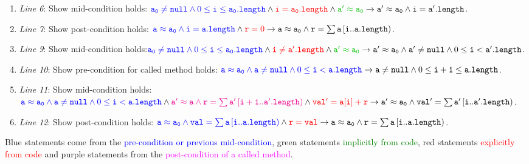 \documentclass[10pt,twoside,twocolumn]{article}
\begin{document}
\begin{enumerate}
\item \emph{Line 6}: Show mid-condition holds: ${\color{blue}\mathtt{a_{0}}\neq\mathtt{null}\land0\leq\mathtt{i}\leq\mathtt{a_{0}.length}}\land{\color{red}\mathtt{i=a_{0}.length}}\land{\color{green}\mathtt{a'}\approx\mathtt{a_{0}}}\rightarrow\mathtt{a'}\approx\mathtt{a_{0}}\land\mathtt{i}=\mathtt{a'.length}$.
\item \emph{Line 7}: Show post-condition holds: ${\color{blue}\mathtt{a}\approx\mathtt{a_{0}}\land\mathtt{i}=\mathtt{a.length}}\land{\color{red}\mathtt{r}=0}\rightarrow\mathtt{a}\approx\mathtt{a_{0}}\land\mathtt{r}=\sum\mathtt{a}\left[\mathtt{i}..\mathtt{a.length}\right)$.
\item \emph{Line 9}: Show mid-condition holds:${\color{blue}\mathtt{a_{0}}\neq\mathtt{null}\land0\leq\mathtt{i}\leq\mathtt{a_{0}.length}}\land{\color{red}\mathtt{i\neq a'.length}}\land{\color{green}\mathtt{a'}\approx\mathtt{a_{0}}}\rightarrow\mathtt{a'}\approx\mathtt{a_{0}}\land\mathtt{a'}\neq\mathtt{null}\land0\leq\mathtt{i}<\mathtt{a'.length}$.
\item \emph{Line 10}: Show pre-condition for called method holds: ${\color{blue}\mathtt{a}\approx\mathtt{a_{0}}\land\mathtt{a}\neq\mathtt{null}\land0\leq\mathtt{i}<\mathtt{a.length}}\rightarrow\mathtt{a}\neq\mathtt{null}\land0\leq\mathtt{i+1}\leq\mathtt{a.length}$.
\item \emph{Line 11}: Show mid-condition holds: ${\color{blue}\mathtt{a}\approx\mathtt{a_{0}}\land\mathtt{a}\neq\mathtt{null}\land0\leq\mathtt{i}<\mathtt{a.length}}\land{\color{red}{\color{magenta}\mathtt{a'}\approx\mathtt{a}\land\mathtt{r}=\sum\mathtt{a'}\left[\mathtt{i+1}..\mathtt{a'.length}\right)}}\land{\color{red}\mathtt{val'}=\mathtt{a[i]+r}}\rightarrow\mathtt{a'}\approx\mathtt{a_{0}}\land\mathtt{val'}=\sum\mathtt{a'}\left[\mathtt{i}..\mathtt{a'.length}\right)$.
\item \emph{Line 12}: Show post-condition holds: ${\color{blue}\mathtt{a}\approx\mathtt{a_{0}}\land\mathtt{val}=\sum\mathtt{a}\left[\mathtt{i}..\mathtt{a.length}\right)}\land{\color{red}\mathtt{r}=\mathtt{val}}\rightarrow\mathtt{a}\approx\mathtt{a_{0}}\land\mathtt{r}=\sum\mathtt{a}\left[\mathtt{i}..\mathtt{a.length}\right)$.
\end{enumerate}
Blue statements come from the \textcolor{blue}{pre-condition or previous
mid-condition}, green statements \textcolor{green}{implicitly from
code}, red statements \textcolor{red}{explicitly from code} and purple
statements from the \textcolor{magenta}{post-condition of a called
method}.
\end{document}
